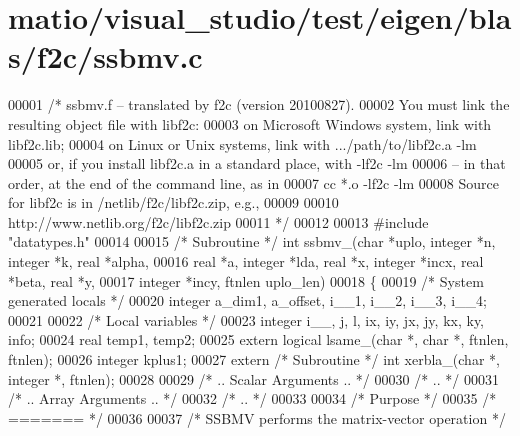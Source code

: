 \hypertarget{matio_2visual__studio_2test_2eigen_2blas_2f2c_2ssbmv_8c_source}{}\section{matio/visual\+\_\+studio/test/eigen/blas/f2c/ssbmv.c}
\label{matio_2visual__studio_2test_2eigen_2blas_2f2c_2ssbmv_8c_source}

\begin{DoxyCode}
00001 \textcolor{comment}{/* ssbmv.f -- translated by f2c (version 20100827).}
00002 \textcolor{comment}{   You must link the resulting object file with libf2c:}
00003 \textcolor{comment}{    on Microsoft Windows system, link with libf2c.lib;}
00004 \textcolor{comment}{    on Linux or Unix systems, link with .../path/to/libf2c.a -lm}
00005 \textcolor{comment}{    or, if you install libf2c.a in a standard place, with -lf2c -lm}
00006 \textcolor{comment}{    -- in that order, at the end of the command line, as in}
00007 \textcolor{comment}{        cc *.o -lf2c -lm}
00008 \textcolor{comment}{    Source for libf2c is in /netlib/f2c/libf2c.zip, e.g.,}
00009 \textcolor{comment}{}
00010 \textcolor{comment}{        http://www.netlib.org/f2c/libf2c.zip}
00011 \textcolor{comment}{*/}
00012 
00013 \textcolor{preprocessor}{#include "datatypes.h"}
00014 
00015 \textcolor{comment}{/* Subroutine */} \textcolor{keywordtype}{int} ssbmv\_(\textcolor{keywordtype}{char} *uplo, integer *n, integer *k, real *alpha, 
00016     real *a, integer *lda, real *x, integer *incx, real *beta, real *y, 
00017     integer *incy, ftnlen uplo\_len)
00018 \{
00019     \textcolor{comment}{/* System generated locals */}
00020     integer a\_dim1, a\_offset, i\_\_1, i\_\_2, i\_\_3, i\_\_4;
00021 
00022     \textcolor{comment}{/* Local variables */}
00023     integer i\_\_, j, l, ix, iy, jx, jy, kx, ky, info;
00024     real temp1, temp2;
00025     \textcolor{keyword}{extern} logical lsame\_(\textcolor{keywordtype}{char} *, \textcolor{keywordtype}{char} *, ftnlen, ftnlen);
00026     integer kplus1;
00027     \textcolor{keyword}{extern} \textcolor{comment}{/* Subroutine */} \textcolor{keywordtype}{int} xerbla\_(\textcolor{keywordtype}{char} *, integer *, ftnlen);
00028 
00029 \textcolor{comment}{/*     .. Scalar Arguments .. */}
00030 \textcolor{comment}{/*     .. */}
00031 \textcolor{comment}{/*     .. Array Arguments .. */}
00032 \textcolor{comment}{/*     .. */}
00033 
00034 \textcolor{comment}{/*  Purpose */}
00035 \textcolor{comment}{/*  ======= */}
00036 
00037 \textcolor{comment}{/*  SSBMV  performs the matrix-vector  operation */}

\end{DoxyCode}
